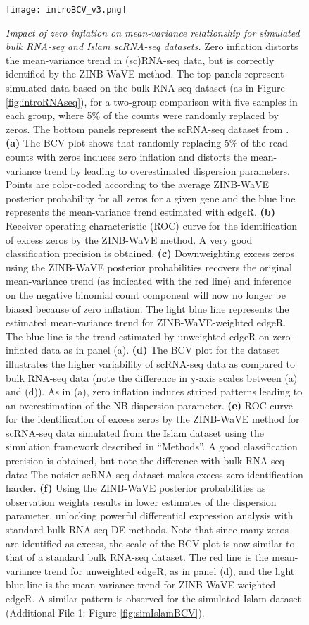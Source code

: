 \documentclass{bmcart}
\newcommand{\RPack}[1]{\textsf{#1}}
\begin{document}
\begin{figure}[h!]
	\center
	\texttt{[image: introBCV\_v3.png]}
	\caption[introFigure]{
     {\em Impact of zero inflation on mean-variance relationship for simulated bulk RNA-seq and Islam scRNA-seq datasets.}
Zero inflation distorts the mean-variance trend in (sc)RNA-seq data, but is correctly identified by the ZINB-WaVE method. The top panels represent simulated data based on the \citet{Bottomly2011} bulk RNA-seq dataset (as in Figure \ref{fig:introRNAseq}), for a two-group comparison with five samples in each group, where 5\% of the counts were randomly replaced by zeros. The bottom panels represent the scRNA-seq dataset from \citet{Islam2011}. 
\textbf{(a)} The BCV plot shows that randomly replacing 5\% of the read counts with zeros induces zero inflation and distorts the mean-variance trend by leading to overestimated dispersion parameters.  Points are color-coded according to the average ZINB-WaVE posterior probability for all zeros for a given gene and the blue line represents the mean-variance trend estimated with \RPack{edgeR}. 
\textbf{(b)} Receiver operating characteristic (ROC) curve for the identification of excess zeros by the ZINB-WaVE method. A very good classification precision is obtained.
\textbf{(c)} Downweighting excess zeros using the ZINB-WaVE posterior probabilities recovers the original mean-variance trend (as indicated with the red line) and inference on the negative binomial count component will now no longer be biased because of zero inflation. The light blue line represents the estimated mean-variance trend for ZINB-WaVE-weighted \RPack{edgeR}. The blue line is the trend estimated by unweighted \RPack{edgeR} on zero-inflated data as in panel (a).
\textbf{(d)} The BCV plot for the \citet{Islam2011} dataset illustrates the higher variability of scRNA-seq data as compared to bulk RNA-seq data (note the difference in y-axis scales between (a) and (d)). As in (a), zero inflation induces striped patterns leading to an overestimation of the NB dispersion parameter.
\textbf{(e)} ROC curve for the identification of excess zeros by the ZINB-WaVE method for scRNA-seq data simulated from the Islam dataset using the simulation framework described in ``Methods''. A good classification precision is obtained, but note the difference with bulk RNA-seq data: The noisier scRNA-seq dataset makes excess zero identification harder.
\textbf{(f)} Using the ZINB-WaVE posterior probabilities as observation weights results in lower estimates of the dispersion parameter, unlocking powerful differential expression analysis with standard bulk RNA-seq DE methods. Note that since many zeros are identified as excess, the scale of the BCV plot is now similar to that of a standard bulk RNA-seq dataset. The red line is the mean-variance trend for unweighted \RPack{edgeR}, as in panel (d), and the light blue line is the mean-variance trend for ZINB-WaVE-weighted \RPack{edgeR}. A similar pattern is observed for the simulated Islam dataset (Additional File 1: Figure \ref{fig:simIslamBCV}).
	}
	\label{fig:introBCV}
\end{figure}
\end{document}

